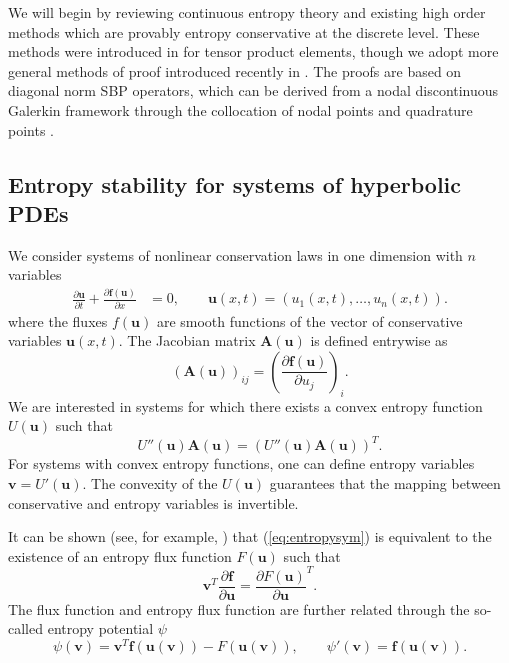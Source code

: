 \documentclass[preprint,10pt]{elsarticle}
\theoremstyle{definition}
\theoremstyle{lemma}
\theoremstyle{theorem}
\theoremstyle{assumption}
\newcommand{\pd}[2]{\frac{\partial#1}{\partial#2}}
\newcommand{\LRp}[1]{\left( #1 \right)}
\newcommand{\note}[1]{{\color{blue}{#1}}}
\begin{document}
We will begin by reviewing continuous entropy theory and existing high order methods which are provably entropy conservative at the discrete level.  These methods were introduced in \cite{fisher2013high, carpenter2014entropy} for tensor product elements, though we adopt more general methods of proof introduced recently in \cite{gassner2017br1, chen2017entropy}.  The proofs are based on diagonal norm SBP operators, which can be derived from a nodal discontinuous Galerkin framework through the collocation of nodal points and quadrature points \cite{gassner2013skew}.

\subsection{Entropy stability for systems of hyperbolic PDEs}


We consider systems of nonlinear conservation laws in one dimension with $n$ variables
\begin{align}
\pd{\bm{u}}{t} + \pd{\bm{f(\bm{u})}}{x} &= 0, \qquad \bm{u}(x,t) = (u_1(x,t),\ldots,u_n(x,t)).
\label{eq:pde}
\end{align}
where the fluxes $f(\bm{u})$ are smooth functions of the vector of conservative variables $\bm{u}({x},t)$.  The Jacobian matrix $\bm{A}(\bm{u})$ is defined entrywise as
\[
\LRp{\bm{A}(\bm{u})}_{ij} = \LRp{\pd{\bm{f}(\bm{u})}{{u}_j}}_i.
\]
We are interested in systems for which there exists a convex entropy function $U(\bm{u})$ such that  
\begin{equation}
U''(\bm{u})\bm{A}(\bm{u}) = \LRp{U''(\bm{u}) \bm{A}(\bm{u})}^T.
\label{eq:entropysym}
\end{equation}
For systems with convex entropy functions, one can define entropy variables $\bm{v} = U'(\bm{u})$.  The convexity of the $U(\bm{u})$ guarantees that the mapping between conservative and entropy variables is invertible.  

It can be shown (see, for example, \cite{mock1980systems}) that (\ref{eq:entropysym}) is equivalent to the existence of an entropy flux function $F(\bm{u})$ such that
\[
\bm{v}^T \pd{\bm{f}}{\bm{u}} = \pd{F(\bm{u})}{\bm{u}}^T.
\]
The flux function and entropy flux function are further related through the so-called entropy potential $\psi$ 
\[
\psi(\bm{v}) = \bm{v}^T\bm{f}(\bm{u}(\bm{v})) - F(\bm{u}(\bm{v})), \qquad \psi'(\bm{v}) = \bm{f}(\bm{u}(\bm{v})).
\]
\end{document}
